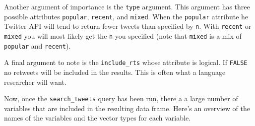 \documentclass[
  letterpaper,
]{latex/krantz}
\begin{document}
Another argument of importance is the \texttt{type} argument. This
argument has three possible attributes \texttt{popular},
\texttt{recent}, and \texttt{mixed}. When the \texttt{popular} attribute
he Twitter API will tend to return fewer tweets than specified by
\texttt{n}. With \texttt{recent} or \texttt{mixed} you will most likely
get the \texttt{n} you specified (note that \texttt{mixed} is a mix of
\texttt{popular} and \texttt{recent}).

A final argument to note is the \texttt{include\_rts} whose attribute is
logical. If \texttt{FALSE} no retweets will be included in the results.
This is often what a language researcher will want.

Now, once the \texttt{search\_tweets} query has been run, there a a
large number of variables that are included in the resulting data frame.
Here's an overview of the names of the variables and the vector types
for each variable.
\end{document}
